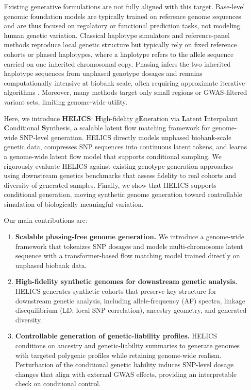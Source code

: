\documentclass{article}
\begin{document}
Existing generative formulations are not fully aligned with this target. 
Base-level genomic foundation models \cite{nguyen2023hyenadna, dalla2025nucleotide, zhou2023dnabert} are typically trained on reference genome sequences and are thus focused on regulatory or functional prediction tasks, not modeling human genetic variation. Classical haplotype simulators and reference-panel methods reproduce local genetic structure but typically rely on fixed reference cohorts or phased haplotypes, where a haplotype refers to the allele sequence carried on one inherited chromosomal copy. Phasing infers the two inherited haplotype sequences from unphased genotype dosages and remains computationally intensive at biobank scale, often requiring approximate iterative algorithms \cite{hofmeister2023accurate,browning2021fast}. Moreover, many methods target only small regions or GWAS-filtered variant sets, limiting genome-wide utility.

Here, we introduce \textbf{HELICS}: \textbf{H}igh-fidelity g\textbf{E}neration via \textbf{L}atent \textbf{I}nterpolant \textbf{C}onditional \textbf{S}ynthesis, a scalable latent flow matching framework for genome-wide SNP-level generation. HELICS directly models unphased biobank-scale genetic data, compresses SNP sequences into continuous latent tokens, and learns a genome-wide latent flow model that supports conditional sampling. We rigorously evaluate HELICS against existing genotype-generation approaches using downstream genetics benchmarks that assess fidelity to real cohorts and diversity of generated samples. Finally, we show that HELICS supports conditional generation, moving synthetic genome generation toward controllable simulation of biologically meaningful variation.

Our main contributions are:

\begin{enumerate}

    \item \textbf{Scalable phasing-free genome generation.} We introduce a genome-wide framework that tokenizes SNP dosages and models multi-chromosome latent sequence with a transformer-based flow matching model trained directly on unphased biobank data.

    \item \textbf{High-fidelity synthetic genomes for downstream genetic analysis.} HELICS generates synthetic cohorts that preserve key structure for downstream genetic analysis, including allele-frequency (AF) spectra, linkage disequilibrium (LD; local SNP correlation), ancestry geometry, and generated diversity.

    \item \textbf{Controllable generation of genetic-liability profiles.} HELICS conditions on ancestry and genetic-liability summaries to generate genomes with targeted polygenic profiles while retaining genome-wide realism. Perturbation of the conditional genetic liability induces SNP-level dosage changes that align with external GWAS effects, providing an interpretable check on conditional control.

\end{enumerate}
\end{document}
